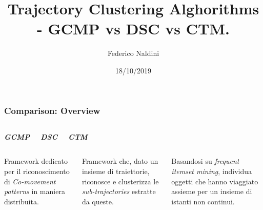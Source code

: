 \documentclass{beamer}
\title[Trajectory Clustering Comparison]{Trajectory Clustering Alghorithms - GCMP vs DSC vs CTM. } %
\author{Federico Naldini} %
\institute[Università di Bologna] %
{
Alma Mater Studiorum - Università di Bologna, Cesena. \\ %
\medskip
\textit{federico.naldini3@studio.unibo.it} %
}
\date{18/10/2019} %
\begin{document}
\begin{frame}
\titlepage %
\end{frame}


\begin{frame}
	\frametitle{Comparison: Overview}
	\begin{columns}
		
		\begin{center}
			\textbf{\textit{\huge{GCMP}}}
			
		\end{center}
		
		\begin{center}
			\textbf{\textit{\huge{DSC}}}
			
		\end{center}
		
		\begin{center}
			\textbf{\textit{\huge{CTM}}}
			
		\end{center}
	\end{columns}
	\begin{columns}
		
		\column{.3\columnwidth}
		
	Framework dedicato per il riconoscimento di \textit{Co-movement patterns} in maniera distribuita.
		
		
		\column{.3\textwidth}
	
			Framework che, dato un insieme di traiettorie, riconosce e clusterizza le \textit{sub-trajectories} estratte da queste.
		
		\column{.3\textwidth}
		
		Basandosi su \textit{frequent itemset mining}, individua oggetti  che hanno viaggiato assieme per un insieme di istanti non continui.

	\end{columns}
\end{frame}     
\end{document}
